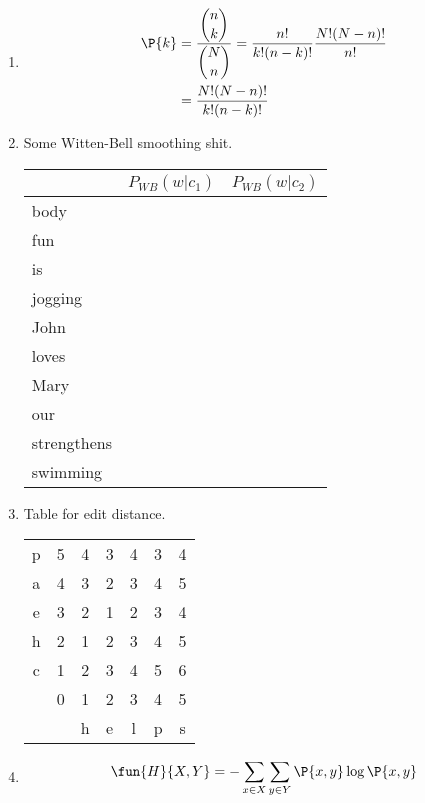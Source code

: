 \documentclass[]{homework}
\begin{document}

\begin{enumerate}
	\item 
		\begin{align*}
			\P{k} &= \frac{\displaystyle {n \choose k}}{\displaystyle {N \choose n}} =
				\frac{n!}{k!(n-k)!} \frac{N!(N-n)!}{n!}\\
				&= \frac{N!(N-n)!}{k!(n-k)!}
		\end{align*}
	\item Some Witten-Bell smoothing shit.\\
		\begin{tabular}{| l | l | l |}
			\hline
					&	$P_{WB}(w | c_1)$	&	$P_{WB}(w | c_2)$ 	\\
			\hline
			body		&						&						\\
			fun			&						&						\\
			is			&						&						\\
			jogging		&						&						\\
			John		&						&						\\
			loves		&						&						\\
			Mary		&						&						\\
			our			&						&						\\
			strengthens	&						&						\\
			swimming	&						&						\\
			\hline
		\end{tabular}
	\item 
		Table for edit distance.\\
		\begin{center}
		\begin{tabular}{|c|c|c|c|c|c|c|}
			\hline
			p &	5	& 4	& 3	& 4	& 3	& 4 \\
			a &	4	& 3	& 2	& 3	& 4	& 5	\\
			e &	3	& 2	& 1	& 2	& 3	& 4	\\
			h &	2	& 1	& 2	& 3	& 4	& 5	\\
			c &	1	& 2	& 3	& 4	& 5	& 6	\\
			  &	0	& 1	& 2	& 3	& 4	& 5	\\
			\hline
			  &		& h	& e	& l	& p	& s	\\
			\hline
		\end{tabular}
		\end{center}
	\item
		\begin{align*}
			\fun{H}{X,Y}
			&= -\sum_{x \in X} \sum_{y \in Y}\P{x,y} \log \P{x,y}\\

\end{align*}
\end{enumerate}
\end{document}
